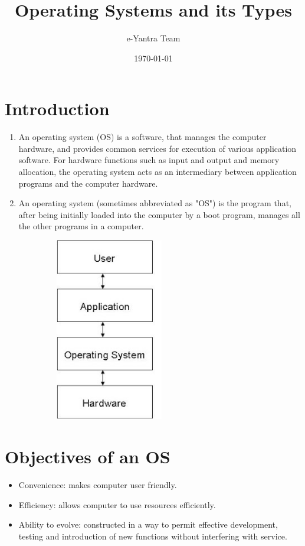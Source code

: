 \documentclass[11pt,a4paper]{article}
\title{Operating Systems and its Types}
\author{e-Yantra Team}
\date{\today}
\begin{document}
	\maketitle
	\newpage
	\tableofcontents
	\newpage
	\section{Introduction}
	\begin{enumerate}
		\item An operating system (OS) is a software, that manages the computer hardware, and provides common services for execution of various application software.  For hardware functions such as input and output and memory allocation, the operating system acts as an intermediary between application programs and the computer hardware.
		\item An operating system (sometimes abbreviated as "OS") is the program that, after being initially loaded into the computer by a boot program, manages all the other programs in a computer.
		\begin{figure}[h!]
			\includegraphics[width=6cm, height=8cm]{os.JPG}
			\centering
		\end{figure} 
	\end{enumerate} 
	\section{Objectives of an OS}
	\begin{itemize}
		\item Convenience: makes computer user friendly.
		\item Efficiency: allows computer to use resources efficiently.
		\item Ability to evolve: constructed in a way to permit effective development, testing and introduction of new functions without interfering with service.
	\end{itemize}
	
\end{document}
